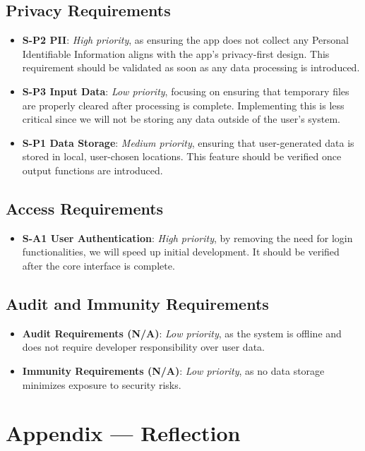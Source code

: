 \documentclass{article}
\begin{document}
\subsection{Privacy Requirements}
\begin{itemize}
    \item \textbf{S-P2 PII}: \textit{High priority}, as ensuring the app does not collect any Personal Identifiable Information aligns with the app’s privacy-first design. This requirement should be validated as soon as any data processing is introduced.
    \item \textbf{S-P3 Input Data}: \textit{Low priority}, focusing on ensuring that temporary files are properly cleared after processing is complete. Implementing this is less critical since we will not be storing any data outside of the user’s system.
    \item \textbf{S-P1 Data Storage}: \textit{Medium priority}, ensuring that user-generated data is stored in local, user-chosen locations. This feature should be verified once output functions are introduced.
\end{itemize}

\subsection{Access Requirements}
\begin{itemize}
    \item \textbf{S-A1 User Authentication}: \textit{High priority}, by removing the need for login functionalities, we will speed up initial development. It should be verified after the core interface is complete.
\end{itemize}

\subsection{Audit and Immunity Requirements}
\begin{itemize}
    \item \textbf{Audit Requirements (N/A)}: \textit{Low priority}, as the system is offline and does not require developer responsibility over user data.
    \item \textbf{Immunity Requirements (N/A)}: \textit{Low priority}, as no data storage minimizes exposure to security risks.
\end{itemize}


\newpage{}

\section*{Appendix --- Reflection}
\end{document}
